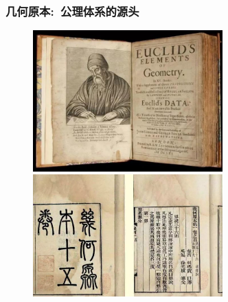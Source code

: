 \frame
{
	\frametitle{几何原本:~公理体系的源头}
\begin{figure}[h!]
\centering
\vspace{-13pt}
\includegraphics[height=0.38\textwidth,width=0.65\textwidth,viewport=0 0 680 500,clip]{Figures/Element_Geometry_1.jpg}\\
\vspace{1pt}
\includegraphics[height=0.36\textwidth,width=0.65\textwidth,viewport=0 0 810 500,clip]{Figures/Element_Geometry_2.jpg}
\label{Element_Geometru}
\end{figure}
}

